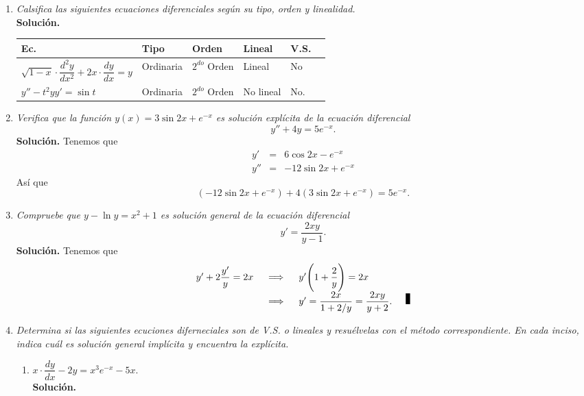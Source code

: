 \documentclass[10pt,a5paper]{article}
\begin{document}
\titulo

\begin{enumerate}
	\item \textit{Calsifica las siguientes ecuaciones diferenciales según su tipo, orden y linealidad.} \\[2mm]
		\textbf{Solución.} 
		\begin{table}[ht]
			\centering
			\begin{tabular}{|*{6} {l|}}
				\hline
				Ec. & Tipo & Orden & Lineal & V.S. \\ \hline
				\(\sqrt{1-x} \cdot \dfrac{d^2y}{dx^2} +2x \cdot \dfrac{dy}{dx} = y\) & Ordinaria & \(2^{do}\) Orden & Lineal & No \\ \hline
				\(y'' -t^2yy' = \sin t\) & Ordinaria & \(2^{do}\) Orden & No lineal & No. \\ \hline
			\end{tabular}
		\end{table}
	\item \textit{Verifica que la función \(y(x) = 3 \sin 2x+e^{-x}\) es solución explícita de la ecuación diferencial} 
		\[
			y'' +4y=5e^{-x}.
		\]
		\textbf{Solución.} Tenemos que
		\[
			\begin{array}{rcl}
				y' & = & 6 \cos 2x-e^{-x} \\[2mm]
				y'' & = & -12 \sin 2x+e^{-x}
			\end{array}
		\]
		Así que
		\[
			(-12 \sin 2x+e^{-x}) +4(3 \sin 2x+e^{-x}) = 5e^{-x}.
		\]
	\item \textit{Compruebe que \(y- \ln y=x^2+1\) es solución general de la ecuación diferencial}
		\[
			y' = \dfrac{2xy}{y-1}.
		\]
		\textbf{Solución.} Tenemos que
		\[
			\begin{array}{rcl}
				y' +2 \dfrac{y'}{y} =2x & \;\implies\; & y' \Bigg(1+ \dfrac{2}{y}\Bigg) = 2x \\[2mm]
				& \;\implies\; & y' = \dfrac{2x}{1+2/y} = \dfrac{2xy}{y+2}. \qed 
			\end{array}
		\]
	\item \textit{Determina si las siguientes ecuciones diferneciales son de V.S. o lineales y resuélvelas con el método correspondiente. En cada inciso, indica cuál es solución general implícita y encuentra la explícita.} 
		\begin{enumerate}
			\item \(x \cdot \dfrac{dy}{dx} -2y=x^3e^{-x} -5x\). \\[2mm]
				\textbf{Solución.}  \\[2mm]

\end{enumerate}
\end{enumerate}
\end{document}
